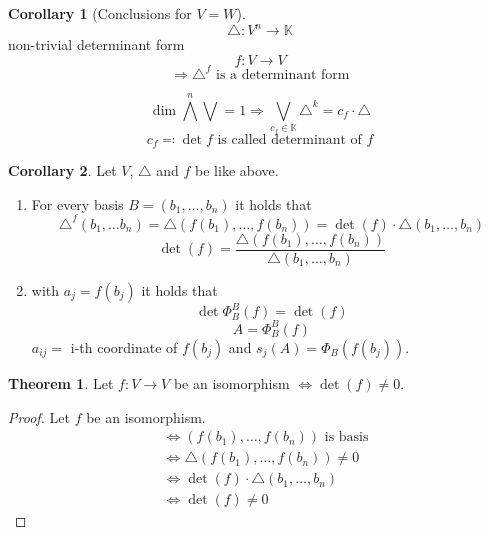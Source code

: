 \documentclass[a4paper,landscape,twocolumn]{article}
\theoremstyle{definition}
\newtheorem{theorem}{Theorem}
\newtheorem{cor}{Corollary}
\begin{document}
\begin{cor}[Conclusions for $V = W$]
  \label{cor-7.26}
  \[ \triangle: V^n \to \mathbb K \]
  non-trivial determinant form
  \[ f: V \to V \]
  \[ \Rightarrow \triangle^f \text{ is a determinant form} \]

  \[ \dim{\bigwedge^n \bigvee} = 1 \Rightarrow \bigvee_{c_f \in \mathbb K} \triangle^k = c_f \cdot \triangle \]
  \[ c_f \eqqcolon \det{f} \text{ is called determinant of $f$} \]
\end{cor}

\begin{cor}
  \label{cor-7.27}
  Let $V$, $\triangle$ and $f$ be like above.
  \begin{enumerate}
    \item
      For every basis $B = (b_1, \ldots, b_n)$
      it holds that
      \[ \triangle^f(b_1, \ldots b_n) = \triangle(f(b_1), \ldots, f(b_n)) = \det(f) \cdot \triangle(b_1, \ldots, b_n) \]
      \[ \det(f) = \frac{\triangle(f(b_1), \ldots, f(b_n))}{\triangle(b_1, \ldots, b_n)} \]
    \item
      with $a_j = f(b_j)$ it holds that
      \[ \det{\Phi_B^B(f)} = \det(f) \]
      \[ A = \Phi_B^B(f) \]
      $a_{ij} = $ i-th coordinate of $f(b_j)$ and $s_j(A) = \Phi_B(f(b_j))$.
  \end{enumerate}
\end{cor}

\begin{theorem}
  \label{theorem-7.28}
  Let $f: V \to V$ be an isomorphism $\Leftrightarrow \det(f) \neq 0$.
\end{theorem}
\begin{proof}
  Let $f$ be an isomorphism.
  \begin{align*}
    &\Leftrightarrow (f(b_1), \ldots, f(b_n)) \text{ is basis} \\
    &\Leftrightarrow \triangle (f(b_1), \ldots, f(b_n)) \neq 0 \\
    &\Leftrightarrow \det(f) \cdot \triangle(b_1, \ldots, b_n) \\
    &\Leftrightarrow \det(f) \neq 0
  \end{align*}
\end{proof}
\end{document}
